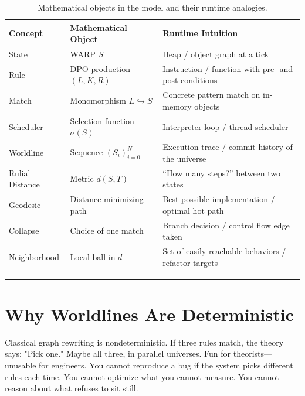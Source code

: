 \begin{table}[h]
\centering
\begin{tabularx}{\linewidth}{@{}l l X@{}}
\toprule
\textbf{Concept} & \textbf{Mathematical Object} & \textbf{Runtime Intuition} \\
\midrule
State & WARP $S$ & Heap / object graph at a tick \\
Rule & DPO production $(L,K,R)$ & Instruction / function with pre- and post-conditions \\
Match & Monomorphism $L \hookrightarrow S$ & Concrete pattern match on in-memory objects \\
Scheduler & Selection function $\sigma(S)$ & Interpreter loop / thread scheduler \\
Worldline & Sequence $(S_i)_{i=0}^N$ & Execution trace / commit history of the universe \\
Rulial Distance & Metric $d(S,T)$ & ``How many steps?'' between two states \\
Geodesic & Distance minimizing path & Best possible implementation / optimal hot path \\
Collapse & Choice of one match & Branch decision / control flow edge taken \\
Neighborhood & Local ball in $d$ & Set of easily reachable behaviors / refactor targets \\
\bottomrule
\end{tabularx}
\caption{Mathematical objects in the \COMPUTER{} model and their runtime analogies.}
\label{table:math-vs-runtime}
\end{table}

\begin{center}
\rule{0.5\linewidth}{0.5pt}
\end{center}

\section{Why Worldlines Are Deterministic}
\label{6.2-why-worldlines-are-deterministic}

Classical graph rewriting is nondeterministic. If three rules match, the theory says: "Pick one."
Maybe all three, in parallel universes. Fun for theorists—unusable for engineers. You cannot
reproduce a bug if the system picks different rules each time. You cannot optimize what you cannot
measure. You cannot reason about what refuses to sit still.

